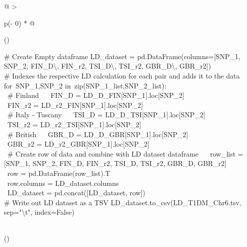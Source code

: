 \documentclass[12pt,a4paper]{article}
\begin{document}
\begin{longtable}[]{@{}
  >{\raggedright\arraybackslash}p{(\columnwidth - 0\tabcolsep) * }@{}}
\toprule()
\endhead
\begin{minipage}[t]{\linewidth}\raggedright
{\# Create Empty dataframe }{\hfill\break
LD\_dataset =
pd.DataFrame(columns={[}}{\textquotesingle SNP\_1\textquotesingle{}}{,
}{\textquotesingle SNP\_2\textquotesingle{}}{,
}{\textquotesingle FIN\_D\textbackslash\textquotesingle\textquotesingle{}}{,
}{\textquotesingle FIN\_r2\textquotesingle{}}{,
}{\textquotesingle TSI\_D\textbackslash\textquotesingle\textquotesingle{}}{,
}{\textquotesingle TSI\_r2\textquotesingle{}}{,
}{\textquotesingle GBR\_D\textbackslash\textquotesingle\textquotesingle{}}{,
}{\textquotesingle GBR\_r2\textquotesingle{}}{{]})\\
}{\# Indexes the respective LD calculation for each pair and adds it to
the data}{\hfill\break
}{for}{~SNP\_1,SNP\_2 }{in}{~zip(SNP\_1\_list,SNP\_2\_list):\\
\hspace*{0.333em} ~}{\# Finland}{\hfill\break
~ ~FIN\_D = LD\_D\_FIN{[}SNP\_1{]}.loc{[}SNP\_2{]}\\
\hspace*{0.333em} ~FIN\_r2 = LD\_r2\_FIN{[}SNP\_1{]}.loc{[}SNP\_2{]}\\
\hspace*{0.333em} ~}{\# Italy - Tuscany}{\hfill\break
~ ~TSI\_D = LD\_D\_TSI{[}SNP\_1{]}.loc{[}SNP\_2{]}\\
\hspace*{0.333em} ~TSI\_r2 = LD\_r2\_TSI{[}SNP\_1{]}.loc{[}SNP\_2{]}\\
\hspace*{0.333em} ~}{\# British}{\hfill\break
~ ~GBR\_D = LD\_D\_GBR{[}SNP\_1{]}.loc{[}SNP\_2{]}\\
\hspace*{0.333em} ~GBR\_r2 = LD\_r2\_GBR{[}SNP\_1{]}.loc{[}SNP\_2{]}\\
\hspace*{0.333em} ~}{\# Create row of data and combine with LD dataset
dataframe}{\hfill\break
~ ~row\_list = {[}SNP\_1, SNP\_2, FIN\_D, FIN\_r2, TSI\_D, TSI\_r2,
GBR\_D, GBR\_r2{]}\\
\hspace*{0.333em} ~row = pd.DataFrame(row\_list).T\\
\hspace*{0.333em} ~row.columns = LD\_dataset.columns\\
\hspace*{0.333em} ~LD\_dataset = pd.concat({[}LD\_dataset, row{]})\\
}{\# Write out LD dataset as a TSV}{\hfill\break
LD\_dataset.to\_csv(}{\textquotesingle LD\_T1DM\_Chr6.tsv\textquotesingle{}}{,
sep=}{"\textbackslash t"}{, index=}{False}{)}\strut
\end{minipage} \\
\bottomrule()
\end{longtable}
\end{document}
